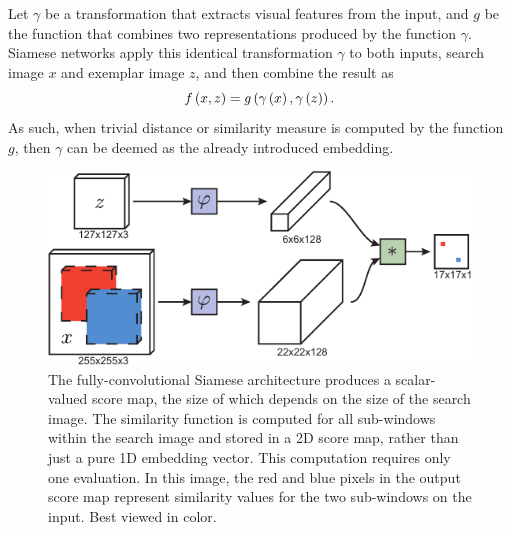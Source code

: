 Let $\gamma$ be a transformation that extracts visual features from the input, and $g$ be the function that combines two representations produced by the function $\gamma$. Siamese networks apply this identical transformation $\gamma$ to both inputs, search image $x$ and exemplar image $z$, and then combine the result as
\begin{equation}
    {f} \left( x, z \right) = {g} \left( {\gamma} \left( x \right), {\gamma} \left( z \right) \right).
\end{equation}
As such, when trivial distance or similarity measure is computed by the function $g$, then $\gamma$ can be deemed as the already introduced embedding.

\begin{figure}[t]
    \centerline{\includegraphics[width=0.6\linewidth]{figures/theoretical_foundations/fully_cnn_siam_tracking_architecture.pdf}}
    \caption[\siamfc{} architecture]{The fully-convolutional Siamese architecture produces a scalar-valued score map, the size of which depends on the size of the search image. The similarity function is computed for all sub-windows within the search image and stored in a 2D score map, rather than just a pure 1D embedding vector. This computation requires only one evaluation. In this image, the red and blue pixels in the output score map represent similarity values for the two sub-windows on the input. Best viewed in color. }
    \label{fig:FullyCNNSiamTrackingArch}
\end{figure}

